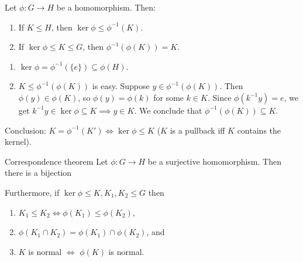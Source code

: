 \documentclass[12pt,letterpaper]{report}
\begin{document}
\begin{lem}{}{}
  Let $\phi \colon G \to H$ be a homomorphism.
  Then:
  \begin{enumerate}
    \item If $K \leq H$, then $\ker\phi \leq \phi^{-1}(K)$.
    \item If $\ker\phi \leq K \leq G$, then $\phi^{-1}(\phi(K)) = K$.
  \end{enumerate}
\end{lem}

\begin{thmproof}
  \begin{enumerate}
    \item $\ker\phi = \phi^{-1}(\{e\}) \subseteq \phi(H)$.
    \item $K \leq \phi^{-1}(\phi(K))$ is easy.
    Suppose $y \in \phi^{-1}(\phi(K))$.
    Then $\phi(y) \in \phi(K)$, so $\phi(y) = \phi(k)$ for some $k \in K$.
    Since $\phi(k^{-1}y) = e$, we get $k^{-1}y \in \ker\phi \subseteq K \implies y \in K$.
    We conclude that $\phi^{-1}(\phi(K)) \subseteq K$.
  \end{enumerate}
\end{thmproof}

Conclusion: $K = \phi^{-1}(K') \iff \ker\phi \leq K$ ($K$ is a pullback iff $K$ contains the
kernel).

\begin{thm}{Correspondence theorem}{}
  Let $\phi \colon G \to H$ be a surjective homomorphism.
  Then there is a bijection
  \begin{center}
  \end{center}
  Furthermore, if $\ker\phi \leq K, K_1, K_2 \leq G$ then
  \begin{enumerate}
    \item $K_1 \leq K_2 \iff \phi(K_1) \leq \phi(K_2)$,
    \item $\phi(K_1 \cap K_2) = \phi(K_1) \cap \phi(K_2)$, and
    \item $K$ is normal $\iff$ $\phi(K)$ is normal.
  \end{enumerate}
\end{thm}
\end{document}
